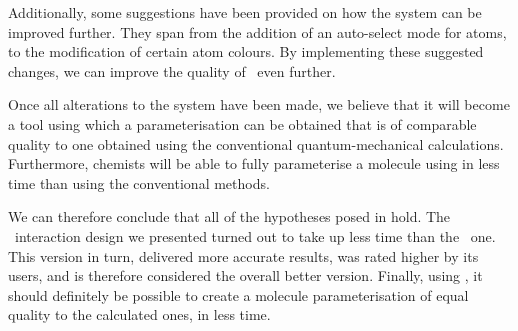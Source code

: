 Additionally, some suggestions have been provided on how the system can be improved further. They span from the addition of an auto-select mode for atoms, to the modification of certain atom colours. By implementing these suggested changes, we can improve the quality of \oframp\ even further.

Once all alterations to the system have been made, we believe that it will become a tool using which a parameterisation can be obtained that is of comparable quality to one obtained using the conventional quantum-mechanical calculations. Furthermore, chemists will be able to fully parameterise a molecule using \oframp{} in less time than using the conventional methods.

We can therefore conclude that all of the hypotheses posed in  hold. The \IDb\ interaction design we presented turned out to take up less time than the \IDa\ one. This version in turn, delivered more accurate results, was rated higher by its users, and is therefore considered the overall better version. Finally, using \oframp, it should definitely be possible to create a molecule parameterisation of equal quality to the calculated ones, in less time.
